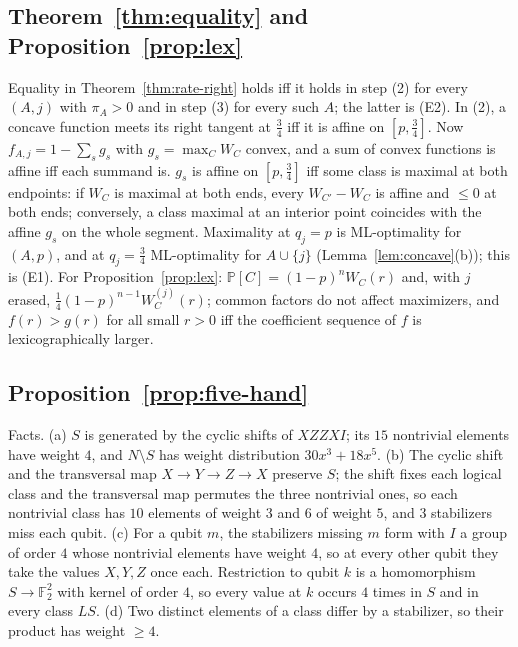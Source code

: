 \documentclass[11pt,a4paper]{article}
\theoremstyle{plain}
\theoremstyle{definition}
\theoremstyle{remark}
\newcommand{\F}{\mathbb{F}_2}
\newcommand{\Prob}{\mathbb{P}}
\begin{document}
\subsection{Theorem~\ref{thm:equality} and Proposition~\ref{prop:lex}}
Equality in Theorem~\ref{thm:rate-right} holds iff it holds in step (2) for every $(A,j)$ with $\pi_A>0$ and in step (3) for every such $A$; the latter is (E2). In (2), a concave function meets its right tangent at $\tfrac34$ iff it is affine on $[p,\tfrac34]$. Now $f_{A,j}=1-\sum_sg_s$ with $g_s=\max_CW_C$ convex, and a sum of convex functions is affine iff each summand is. $g_s$ is affine on $[p,\tfrac34]$ iff some class is maximal at both endpoints: if $W_C$ is maximal at both ends, every $W_{C'}-W_C$ is affine and $\le0$ at both ends; conversely, a class maximal at an interior point coincides with the affine $g_s$ on the whole segment. Maximality at $q_j=p$ is ML-optimality for $(A,p)$, and at $q_j=\tfrac34$ ML-optimality for $A\cup\{j\}$ (Lemma~\ref{lem:concave}(b)); this is (E1).
For Proposition~\ref{prop:lex}: $\Prob[C]=(1-p)^nW_C(r)$ and, with $j$ erased, $\tfrac14(1-p)^{n-1}W^{(j)}_C(r)$; common factors do not affect maximizers, and $f(r)>g(r)$ for all small $r>0$ iff the coefficient sequence of $f$ is lexicographically larger.

\subsection{Proposition~\ref{prop:five-hand}}
Facts. (a) $S$ is generated by the cyclic shifts of $XZZXI$; its $15$ nontrivial elements have weight $4$, and $N\setminus S$ has weight distribution $30x^3+18x^5$. (b) The cyclic shift and the transversal map $X\to Y\to Z\to X$ preserve $S$; the shift fixes each logical class and the transversal map permutes the three nontrivial ones, so each nontrivial class has $10$ elements of weight $3$ and $6$ of weight $5$, and $3$ stabilizers miss each qubit. (c) For a qubit $m$, the stabilizers missing $m$ form with $I$ a group of order $4$ whose nontrivial elements have weight $4$, so at every other qubit they take the values $X,Y,Z$ once each. Restriction to qubit $k$ is a homomorphism $S\to\F^2$ with kernel of order $4$, so every value at $k$ occurs $4$ times in $S$ and in every class $LS$. (d) Two distinct elements of a class differ by a stabilizer, so their product has weight $\ge4$.
\end{document}
